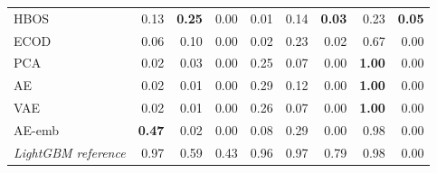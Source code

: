 \begin{table}[tbp]
\begin{tabular}{@{}lrrrrrrrr@{}}
HBOS & 0.13 & \textbf{0.25} & 0.00 & 0.01 & 0.14 & \textbf{0.03} & 0.23 & \textbf{0.05} \\
ECOD & 0.06 & 0.10 & 0.00 & 0.02 & 0.23 & 0.02 & 0.67 & 0.00 \\
PCA & 0.02 & 0.03 & 0.00 & 0.25 & 0.07 & 0.00 & \textbf{1.00} & 0.00 \\
AE & 0.02 & 0.01 & 0.00 & 0.29 & 0.12 & 0.00 & \textbf{1.00} & 0.00 \\
VAE & 0.02 & 0.01 & 0.00 & 0.26 & 0.07 & 0.00 & \textbf{1.00} & 0.00 \\
AE-emb & \textbf{0.47} & 0.02 & 0.00 & 0.08 & 0.29 & 0.00 & 0.98 & 0.00 \\
\addlinespace
\textit{LightGBM reference} & 0.97 & 0.59 & 0.43 & 0.96 & 0.97 & 0.79 & 0.98 & 0.00 \\
\bottomrule
\end{tabular}
\end{table}
